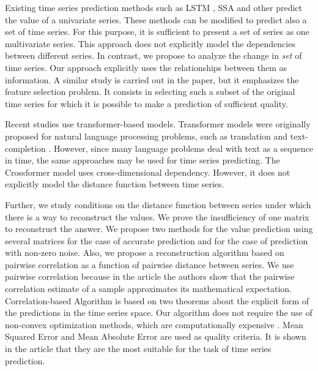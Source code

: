 \documentclass[12pt]{article}
\begin{document}
	Existing time series prediction methods such as LSTM \cite{LSTM}, SSA \cite{SSA} and other \cite{Biosignals, boyd2017multiperiod} predict the value of a univariate series. These methods can be modified to predict also a set of time series. For this purpose, it is sufficient to present a set of series as one multivariate series. This approach does not explicitly model the dependencies between different series. In contrast, we propose to analyze the change in \emph{set} of time series. Our approach explicitly uses the relationships between them as information. A similar study is carried out in the \cite{MulticorrelatedQuadratic} paper, but it emphasizes the feature selection problem. It consists in selecting such a subset of the original time series for which it is possible to make a prediction of sufficient quality.
	
	Recent studies \cite{haoyietal-informer-2021,haoyietal-informerEx-2023,wu2021autoformer,liu2022pyraformer} use transformer-based models. Transformer models were originally proposed for natural language processing problems, such as translation and text-completion \cite{NIPS2017_3f5ee243}. However, since many language problems deal with text as a sequence in time, the same approaches may be used for time series predicting. The Crossformer model \cite{zhang2023crossformer} uses cross-dimensional dependency.  However, it does not explicitly model the distance function between time series.
	
	Further, we study conditions on the distance function between series under which there is a way to reconstruct the values. We prove the insufficiency of one matrix to reconstruct the answer. We propose two methods for the value prediction using several matrices for the case of accurate prediction and for the case of prediction with non-zero noise. Also, we propose a reconstruction algorithm based on pairwise correlation as a function of pairwise distance between series. We use pairwise correlation because in the article \cite{puchkin2023sharper} the authors show that the pairwise correlation estimate of a sample approximates its mathematical expectation. Correlation-based Algorithm is based on two theorems about the explicit form of the predictions in the time series space. Our algorithm does not require the use of non-convex optimization methods, which are computationally expensive \cite{mikhalevich2024methodsnonconvexoptimization}. Mean Squared Error and Mean Absolute Error are used as quality criteria. It is shown in the article \cite{jadon2022comprehensive} that they are the most suitable for the task of time series prediction.
	
\end{document}
